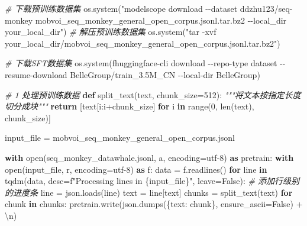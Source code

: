 \documentclass[
]{article}
\newenvironment{Shaded}{}{}
\newcommand{\BuiltInTok}[1]{\textcolor[rgb]{0.00,0.50,0.00}{#1}}
\newcommand{\CharTok}[1]{\textcolor[rgb]{0.25,0.44,0.63}{#1}}
\newcommand{\CommentTok}[1]{\textcolor[rgb]{0.38,0.63,0.69}{\textit{#1}}}
\newcommand{\ControlFlowTok}[1]{\textcolor[rgb]{0.00,0.44,0.13}{\textbf{#1}}}
\newcommand{\DecValTok}[1]{\textcolor[rgb]{0.25,0.63,0.44}{#1}}
\newcommand{\ImportTok}[1]{\textcolor[rgb]{0.00,0.50,0.00}{\textbf{#1}}}
\newcommand{\KeywordTok}[1]{\textcolor[rgb]{0.00,0.44,0.13}{\textbf{#1}}}
\newcommand{\NormalTok}[1]{#1}
\newcommand{\OperatorTok}[1]{\textcolor[rgb]{0.40,0.40,0.40}{#1}}
\newcommand{\SpecialCharTok}[1]{\textcolor[rgb]{0.25,0.44,0.63}{#1}}
\newcommand{\SpecialStringTok}[1]{\textcolor[rgb]{0.73,0.40,0.53}{#1}}
\newcommand{\StringTok}[1]{\textcolor[rgb]{0.25,0.44,0.63}{#1}}
\newcommand{\VariableTok}[1]{\textcolor[rgb]{0.10,0.09,0.49}{#1}}
\begin{document}
\begin{Shaded}
\begin{Highlighting}[]
\CommentTok{\# 下载预训练数据集}
\NormalTok{os.system(}\StringTok{"modelscope download {-}{-}dataset ddzhu123/seq{-}monkey mobvoi\_seq\_monkey\_general\_open\_corpus.jsonl.tar.bz2 {-}{-}local\_dir your\_local\_dir"}\NormalTok{)}
\CommentTok{\# 解压预训练数据集}
\NormalTok{os.system(}\StringTok{"tar {-}xvf your\_local\_dir/mobvoi\_seq\_monkey\_general\_open\_corpus.jsonl.tar.bz2"}\NormalTok{)}

\CommentTok{\# 下载SFT数据集}
\NormalTok{os.system(}\SpecialStringTok{f\textquotesingle{}huggingface{-}cli download {-}{-}repo{-}type dataset {-}{-}resume{-}download BelleGroup/train\_3.5M\_CN {-}{-}local{-}dir BelleGroup\textquotesingle{}}\NormalTok{)}



\CommentTok{\# 1 处理预训练数据}
\KeywordTok{def}\NormalTok{ split\_text(text, chunk\_size}\OperatorTok{=}\DecValTok{512}\NormalTok{):}
    \CommentTok{"""将文本按指定长度切分成块"""}
    \ControlFlowTok{return}\NormalTok{ [text[i:i}\OperatorTok{+}\NormalTok{chunk\_size] }\ControlFlowTok{for}\NormalTok{ i }\KeywordTok{in} \BuiltInTok{range}\NormalTok{(}\DecValTok{0}\NormalTok{, }\BuiltInTok{len}\NormalTok{(text), chunk\_size)]}

\NormalTok{input\_file }\OperatorTok{=} \StringTok{\textquotesingle{}mobvoi\_seq\_monkey\_general\_open\_corpus.jsonl\textquotesingle{}}

\ControlFlowTok{with} \BuiltInTok{open}\NormalTok{(}\StringTok{\textquotesingle{}seq\_monkey\_datawhale.jsonl\textquotesingle{}}\NormalTok{, }\StringTok{\textquotesingle{}a\textquotesingle{}}\NormalTok{, encoding}\OperatorTok{=}\StringTok{\textquotesingle{}utf{-}8\textquotesingle{}}\NormalTok{) }\ImportTok{as}\NormalTok{ pretrain:}
    \ControlFlowTok{with} \BuiltInTok{open}\NormalTok{(input\_file, }\StringTok{\textquotesingle{}r\textquotesingle{}}\NormalTok{, encoding}\OperatorTok{=}\StringTok{\textquotesingle{}utf{-}8\textquotesingle{}}\NormalTok{) }\ImportTok{as}\NormalTok{ f:}
\NormalTok{        data }\OperatorTok{=}\NormalTok{ f.readlines()}
        \ControlFlowTok{for}\NormalTok{ line }\KeywordTok{in}\NormalTok{ tqdm(data, desc}\OperatorTok{=}\SpecialStringTok{f"Processing lines in }\SpecialCharTok{\{}\NormalTok{input\_file}\SpecialCharTok{\}}\SpecialStringTok{"}\NormalTok{, leave}\OperatorTok{=}\VariableTok{False}\NormalTok{):  }\CommentTok{\# 添加行级别的进度条}
\NormalTok{            line }\OperatorTok{=}\NormalTok{ json.loads(line)}
\NormalTok{            text }\OperatorTok{=}\NormalTok{ line[}\StringTok{\textquotesingle{}text\textquotesingle{}}\NormalTok{]}
\NormalTok{            chunks }\OperatorTok{=}\NormalTok{ split\_text(text)}
            \ControlFlowTok{for}\NormalTok{ chunk }\KeywordTok{in}\NormalTok{ chunks:}
\NormalTok{                pretrain.write(json.dumps(\{}\StringTok{\textquotesingle{}text\textquotesingle{}}\NormalTok{: chunk\}, ensure\_ascii}\OperatorTok{=}\VariableTok{False}\NormalTok{) }\OperatorTok{+} \StringTok{\textquotesingle{}}\CharTok{\textbackslash{}n}\StringTok{\textquotesingle{}}\NormalTok{)}


\end{Highlighting}
\end{Shaded}
\end{document}
